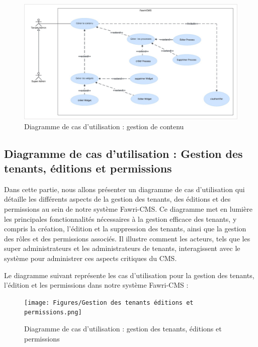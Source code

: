 
\begin{figure}[H]
  \centering
  \includegraphics[width=17cm]{Figures/gestion de contenu.png}
  \caption{Diagramme de cas d'utilisation : gestion de contenu}
\end{figure}



\subsection{Diagramme de cas d'utilisation : Gestion des tenants, éditions et permissions}

\hspace{\parindent}Dans cette partie, nous allons présenter un diagramme de cas d'utilisation qui détaille les différents aspects de la gestion des tenants, des éditions et des permissions au sein de notre système Fawri-CMS. Ce diagramme met en lumière les principales fonctionnalités nécessaires à la gestion efficace des tenants, y compris la création, l'édition et la suppression des tenants, ainsi que la gestion des rôles et des permissions associés. Il illustre comment les acteurs, tels que les super administrateurs et les administrateurs de tenants, interagissent avec le système pour administrer ces aspects critiques du CMS.

Le diagramme suivant représente les cas d'utilisation pour la gestion des tenants, l'édition et les permissions dans notre système Fawri-CMS :

\begin{figure}[H]
  \centering
  \texttt{[image: Figures/Gestion des tenants éditions et permissions.png]}
  \caption{Diagramme de cas d'utilisation : gestion des tenants, éditions et permissions}
\end{figure}





